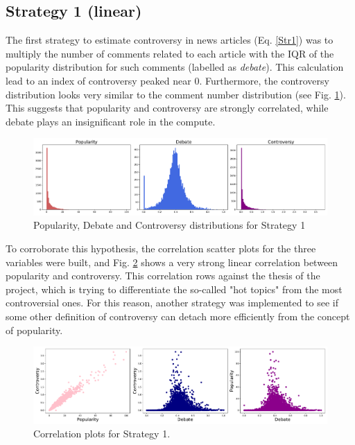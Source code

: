 \subsection{Strategy 1 (linear)}
\label{Strategy1}
The first strategy to estimate controversy in news articles (Eq. \ref{Str1}) was to multiply the number of comments related to each article with the IQR of the popularity distribution for such comments (labelled as \textit{debate}). This calculation lead to an index of controversy peaked near 0. Furthermore, the controversy distribution looks very similar to the comment number distribution (see Fig. \ref{Str1Dist}). This suggests that popularity and controversy are strongly correlated, while debate plays an insignificant role in the compute. 

\begin{figure}[tb]
\centering
\includegraphics[width=\tw]{Pictures/Strat1Dist.pdf}
\caption{Popularity, Debate and Controversy distributions for Strategy 1}
\label{Str1Dist}
\end{figure}

To corroborate this hypothesis, the correlation scatter plots for the three variables were built, and Fig. \ref{Str1Corr} shows a very strong linear correlation between popularity and controversy. This correlation rows against the thesis of the project, which is trying to differentiate the so-called "hot topics" from the most controversial ones. For this reason, another strategy was implemented to see if some other definition of controversy can detach more efficiently from the concept of popularity.

\begin{figure}[tb]
\centering
\includegraphics[width=\tw]{Pictures/Strat1Corr.pdf}
\caption{Correlation plots for Strategy 1.}
\label{Str1Corr}
\end{figure}

